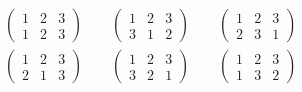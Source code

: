 
\begin{align*}
	&\begin{pmatrix}
		1 & 2 & 3 \\
		1 & 2 & 3
	\end{pmatrix} \qquad
	\begin{pmatrix}
		1 & 2 & 3 \\
		3 & 1 & 2
	\end{pmatrix} \qquad
	\begin{pmatrix}
		1 & 2 & 3 \\
		2 & 3 & 1
	\end{pmatrix} \\[6pt]
	&\begin{pmatrix}
		1 & 2 & 3 \\
		2 & 1 & 3
	\end{pmatrix} \qquad
	\begin{pmatrix}
		1 & 2 & 3 \\
		3 & 2 & 1
	\end{pmatrix} \qquad
	\begin{pmatrix}
		1 & 2 & 3 \\
		1 & 3 & 2
	\end{pmatrix}
\end{align*}